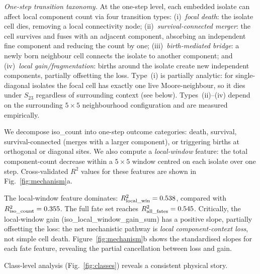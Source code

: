 \documentclass[aip,cha,preprint,nofootinbib]{revtex4-2}
\begin{document}
\textit{One-step transition taxonomy.}
At the one-step level, each embedded isolate can affect local component count
via four transition types:
(i)~\emph{focal death}: the isolate cell dies, removing a local
connectivity node;
(ii)~\emph{survival-connected merger}: the cell survives and fuses with
an adjacent component, absorbing an independent fine component and reducing
the count by one;
(iii)~\emph{birth-mediated bridge}: a newly born neighbour cell connects
the isolate to another component; and
(iv)~\emph{local gain/fragmentation}: births around the isolate create
new independent components, partially offsetting the loss.
Type~(i) is partially analytic: for single-diagonal isolates the focal
cell has exactly one live Moore-neighbour, so it dies under $S_{23}$
regardless of surrounding context (see below).
Types~(ii)--(iv) depend on the surrounding $5\times 5$ neighbourhood
configuration and are measured empirically.

We decompose iso\_count into one-step outcome categories:
death, survival, survival-connected (merges with a larger component),
or triggering births at orthogonal or diagonal sites.
We also compute a \emph{local-window} feature: the total component-count
decrease within a $5\times 5$ window centred on each isolate over one step.
Cross-validated $R^2$ values for these features are shown in
Fig.~\ref{fig:mechanism}a.

The local-window feature dominates:
$R^2_{\rm local\_win} = 0.538$, compared with
$R^2_{\rm iso\_count} = 0.355$.
The full fate set reaches $R^2_{\rm all\_fates} = 0.545$.
Critically, the local-window gain (iso\_local\_window\_gain\_sum) has a
positive slope, partially offsetting the loss: the net mechanistic pathway is
\emph{local component-context loss}, not simple cell death.
Figure~\ref{fig:mechanism}b shows the standardised slopes for each fate
feature, revealing the partial cancellation between loss and gain.

Class-level analysis (Fig.~\ref{fig:classes}) reveals a consistent
physical story.
\end{document}
